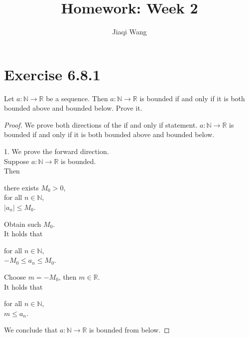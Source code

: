 \documentclass{article}
\title{Homework: Week 2}
\author{Jiaqi Wang}
\newcommand{\N}{\mathbb{N}}
\newcommand{\R}{\mathbb{R}}
\theoremstyle{mytheoremstyle}
\theoremstyle{mytheoremstyle}
\theoremstyle{myproblemstyle}
\begin{document}
    \maketitle

    \section{Exercise 6.8.1}
    \begin{problem}
        Let $a: \N \to \R$ be a sequence. Then $a: \N \to \R$ is bounded if and only if it is both bounded above and bounded below. Prove it.
    \end{problem}
    \begin{proof}
        We prove both directions of the if and only if statement.
        $a: \N \to \R$ is bounded if and only if it is both bounded above and bounded below.

        1. We prove the forward direction. \\
        Suppose $a: \N \to \R$ is bounded. \\
        Then
        \begin{center}
            \parbox{\linewidth}{
                \linewidth
                there exists $M_0 > 0$, \\
                \hspace*{1em} for all $n \in \N$, \\
                \hspace*{2em} $|a_n| \leq M_0$.
            }
        \end{center}
        Obtain such $M_0$. \\
        It holds that
        \begin{center}
            \parbox{\linewidth}{
                \linewidth
                for all $n \in \N$, \\
                \hspace*{1em} $-M_0 \leq a_n \leq M_0$.
            }
        \end{center}
        Choose $m = -M_0$, then $m \in \R$. \\
        It holds that
        \begin{center}
            \parbox{\linewidth}{
                \linewidth
                for all $n \in \N$, \\
                \hspace*{1em} $m \leq a_n$.
            }
        \end{center}
        We conclude that $a:\N \to \R$ is bounded from below.


\end{proof}
\end{document}
